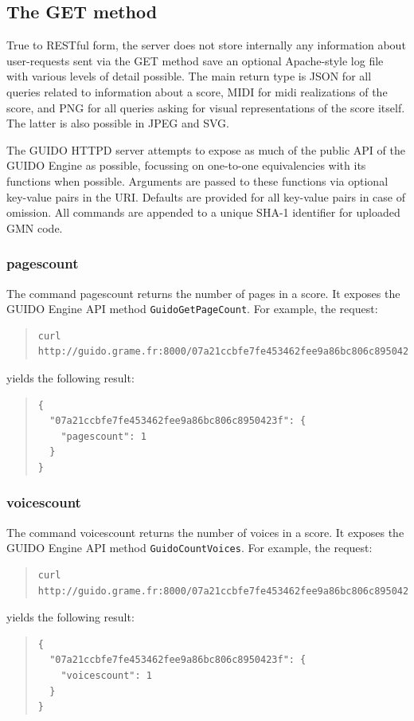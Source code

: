 \documentclass[a4paper]{article}
\begin{document}
\subsection{The GET method}
True to RESTful form, the server does not store internally any information about user-requests sent via the GET method save an optional Apache-style log file with various levels of detail possible.  The main return type is JSON for all queries related to information about a score, MIDI for midi realizations of the score, and PNG for all queries asking for visual representations of the score itself.  The latter is also possible in JPEG and SVG.\par
The GUIDO HTTPD server attempts to expose as much of the public API of the GUIDO Engine as possible, focussing on one-to-one equivalencies with its functions when possible.  Arguments are passed to these functions via optional key-value pairs in the URI.  Defaults are provided for all key-value pairs in case of omission.  All commands are appended to a unique SHA-1 identifier for uploaded GMN code.
\subsubsection{pagescount}
The command pagescount returns the number of pages in a score.  It exposes the GUIDO Engine API method \verb=GuidoGetPageCount=.  For example, the request:
\begin{quote}
\begingroup
\fontsize{7.5pt}{12pt}\selectfont
\begin{verbatim}
curl http://guido.grame.fr:8000/07a21ccbfe7fe453462fee9a86bc806c8950423f/pagecount
\end{verbatim}
\endgroup
\end{quote}
yields the following result:
\begin{quote}
\begin{verbatim}
{
  "07a21ccbfe7fe453462fee9a86bc806c8950423f": {
    "pagescount": 1
  }
}
\end{verbatim}
\end{quote}

\subsubsection{voicescount}
The command voicescount returns the number of voices in a score.  It exposes the GUIDO Engine API method \verb=GuidoCountVoices=.  For example, the request:
\begin{quote}
\begingroup
\fontsize{7.5pt}{12pt}\selectfont
\begin{verbatim}
curl http://guido.grame.fr:8000/07a21ccbfe7fe453462fee9a86bc806c8950423f/voicescount
\end{verbatim}
\endgroup
\end{quote}
yields the following result:
\begin{quote}
\begin{verbatim}
{
  "07a21ccbfe7fe453462fee9a86bc806c8950423f": {
    "voicescount": 1
  }
}
\end{verbatim}
\end{quote}
\end{document}
